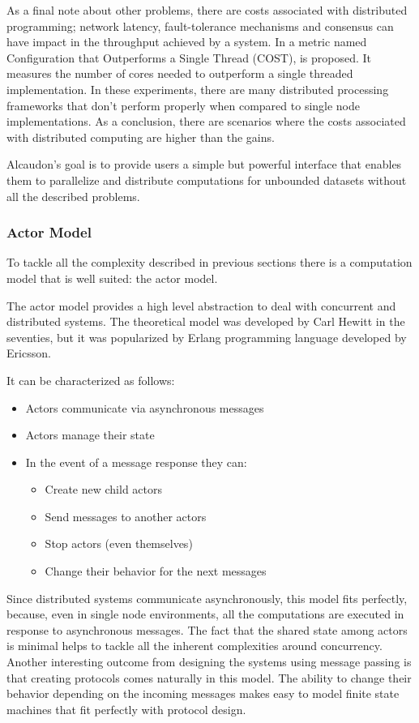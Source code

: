 As a final note about other problems, there are costs associated with
distributed programming; network latency, fault-tolerance mechanisms and
consensus can have impact in the throughput achieved by a system. In
\cite{189908} a metric named Configuration that Outperforms a Single Thread
(COST), is proposed. It measures the number of cores needed to outperform a
single threaded implementation. In these experiments, there are many distributed
processing frameworks that don't perform properly when compared to single node
implementations. As a conclusion, there are scenarios where the costs associated
with distributed computing are higher than the gains.

Alcaudon's goal is to provide users a simple but powerful interface that enables
them to parallelize and distribute computations for unbounded datasets without all
the described problems.

\subsubsection{Actor Model}

To tackle all the complexity described in previous sections there is a
computation model that is well suited: the actor model.

The actor model provides a high level abstraction to deal with concurrent and
distributed systems. The theoretical model was developed by Carl Hewitt in
the seventies, but it was popularized by Erlang programming language\cite{erlang}
developed by Ericsson.

It can be characterized as follows:
\begin{itemize}
\item Actors communicate via asynchronous messages
\item Actors manage their state
\item In the event of a message response they can:
  \begin{itemize}
  \item Create new child actors
  \item Send messages to another actors
  \item Stop actors (even themselves)
  \item Change their behavior for the next messages
  \end{itemize}
\end{itemize}

Since distributed systems communicate asynchronously, this model fits perfectly,
because, even in single node environments, all the computations are executed in
response to asynchronous messages. The fact that the shared state among actors
is minimal helps to tackle all the inherent complexities around concurrency.
Another interesting outcome from designing the systems using message passing is
that creating protocols comes naturally in this model. The ability to change
their behavior depending on the incoming messages makes easy to model finite
state machines that fit perfectly with protocol design.


